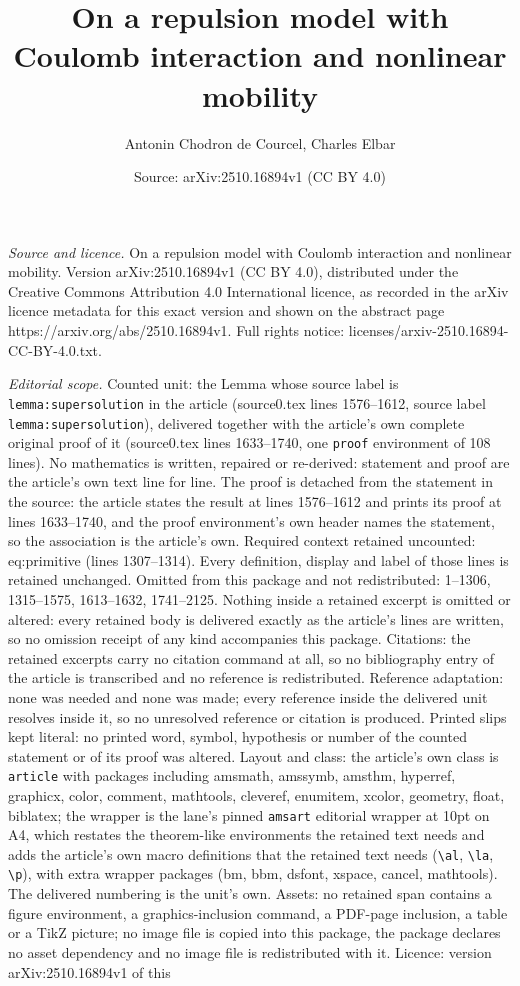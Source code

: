 \documentclass[10pt,a4paper]{amsart}
\title[On a repulsion model with Coulomb interaction and nonlinear ]{On a repulsion model with Coulomb interaction and nonlinear mobility}
\author{Antonin Chodron de Courcel, Charles Elbar}
\date{Source: arXiv:2510.16894v1 (CC BY 4.0)}
\begin{document}
\maketitle

\noindent\emph{Source and licence.} On a repulsion model with Coulomb interaction and nonlinear mobility. Version arXiv:2510.16894v1 (CC BY 4.0), distributed under the Creative Commons Attribution 4.0 International licence, as recorded in the arXiv licence metadata for this exact version and shown on the abstract page https://arxiv.org/abs/2510.16894v1. Full rights notice: licenses/arxiv-2510.16894-CC-BY-4.0.txt.\par\smallskip

\noindent\textit{Editorial scope.} Counted unit: the Lemma whose source label is \texttt{lemma:supersolution} in the article (source0.tex lines 1576--1612, source label \texttt{lemma:supersolution}), delivered together with the article's own complete original proof of it (source0.tex lines 1633--1740, one \texttt{proof} environment of 108 lines). No mathematics is written, repaired or re-derived: statement and proof are the article's own text line for line. The proof is detached from the statement in the source: the article states the result at lines 1576--1612 and prints its proof at lines 1633--1740, and the proof environment's own header names the statement, so the association is the article's own. Required context retained uncounted: eq:primitive (lines 1307--1314). Every definition, display and label of those lines is retained unchanged. Omitted from this package and not redistributed: 1--1306, 1315--1575, 1613--1632, 1741--2125. Nothing inside a retained excerpt is omitted or altered: every retained body is delivered exactly as the article's lines are written, so no omission receipt of any kind accompanies this package. Citations: the retained excerpts carry no citation command at all, so no bibliography entry of the article is transcribed and no reference is redistributed. Reference adaptation: none was needed and none was made; every reference inside the delivered unit resolves inside it, so no unresolved reference or citation is produced. Printed slips kept literal: no printed word, symbol, hypothesis or number of the counted statement or of its proof was altered. Layout and class: the article's own class is \texttt{article} with packages including amsmath, amssymb, amsthm, hyperref, graphicx, color, comment, mathtools, cleveref, enumitem, xcolor, geometry, float, biblatex; the wrapper is the lane's pinned \texttt{amsart} editorial wrapper at 10pt on A4, which restates the theorem-like environments the retained text needs and adds the article's own macro definitions that the retained text needs (\texttt{\textbackslash al}, \texttt{\textbackslash la}, \texttt{\textbackslash p}), with extra wrapper packages (bm, bbm, dsfont, xspace, cancel, mathtools). The delivered numbering is the unit's own. Assets: no retained span contains a figure environment, a graphics-inclusion command, a PDF-page inclusion, a table or a TikZ picture; no image file is copied into this package, the package declares no asset dependency and no image file is redistributed with it. Licence: version arXiv:2510.16894v1 of this 
\end{document}
